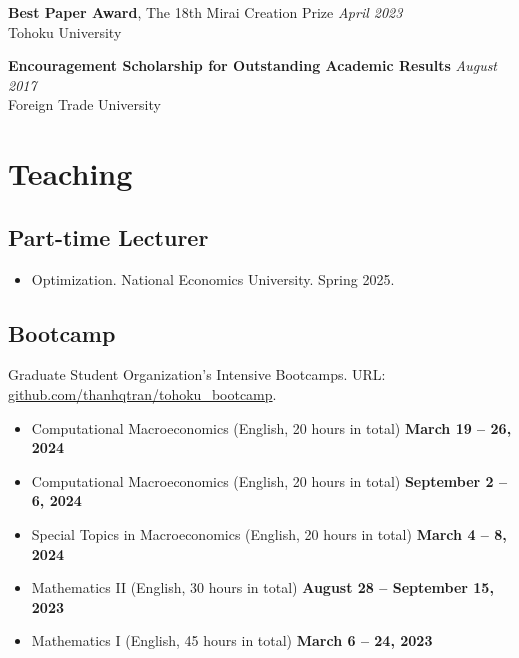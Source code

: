 \documentclass[12pt]{article}
\begin{document}
\textbf{Best Paper Award}, The 18th Mirai Creation Prize \hfill \emph{April 2023}\\
Tohoku University

\textbf{Encouragement Scholarship for Outstanding Academic Results} \hfill \emph{August 2017}\\
Foreign Trade University


\section{Teaching}

\subsection{Part-time Lecturer}
\begin{itemize}
	\item[ ] Optimization. National Economics University. Spring 2025.
\end{itemize}

\subsection{Bootcamp}
Graduate Student Organization's Intensive Bootcamps. URL: \href{https://github.com/thanhqtran/tohoku_bootcamp}{github.com/thanhqtran/tohoku\_bootcamp}.
\begin{itemize}
	\item[ ] Computational Macroeconomics (English, 20 hours in total) \hfill {\bf March 19 -- 26, 2024}
	\item[ ] Computational Macroeconomics  (English, 20 hours in total) \hfill {\bf September 2 -- 6, 2024}
	\item[ ] Special Topics in Macroeconomics (English, 20 hours in total) \hfill {\bf March 4 -- 8, 2024}
	\item[ ] Mathematics II (English, 30 hours in total)  \hfill {\bf August 28 -- September 15, 2023}
	\item[ ] Mathematics I  (English, 45 hours in total)  \hfill {\bf March 6 -- 24, 2023}
\end{itemize}
\end{document}
